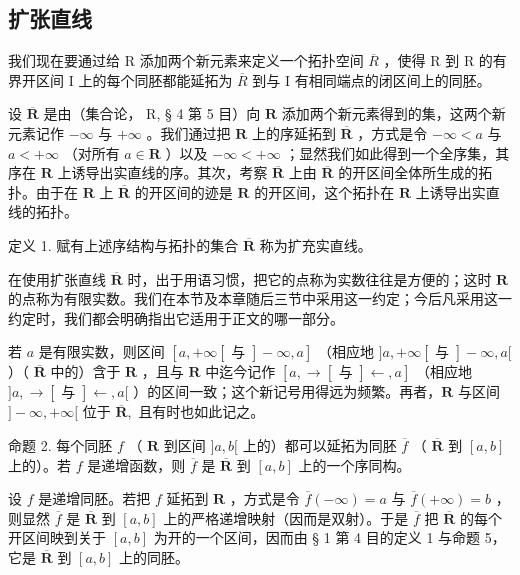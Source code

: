\subsection{扩张直线}

我们现在要通过给 R 添加两个新元素来定义一个拓扑空间 \(\overline{R}\) ，使得 R 到 R 的有界开区间 I 上的每个同胚都能延拓为 \(\overline{R}\) 到与 I 有相同端点的闭区间上的同胚。

设 \(\overline{\mathbf{R}}\) 是由（集合论， R, § 4 第 5 目）向 \(\mathbf{R}\) 添加两个新元素得到的集，这两个新元素记作 \(-\infty\) 与 \(+\infty\) 。我们通过把 \(\mathbf{R}\) 上的序延拓到 \(\overline{\mathbf{R}}\) ，方式是令 \(-\infty < a\) 与 \(a < +\infty\) （对所有 \(a \in \mathbf{R}\) ）以及 \(-\infty < +\infty\) ；显然我们如此得到一个全序集，其序在 \(\mathbf{R}\) 上诱导出实直线的序。其次，考察 \(\overline{\mathbf{R}}\) 上由 \(\overline{\mathbf{R}}\) 的开区间全体所生成的拓扑。由于在 \(\mathbf{R}\) 上 \(\overline{\mathbf{R}}\) 的开区间的迹是 \(\mathbf{R}\) 的开区间，这个拓扑在 \(\mathbf{R}\) 上诱导出实直线的拓扑。

定义 1. 赋有上述序结构与拓扑的集合 \(\overline{\mathbf{R}}\) 称为扩充实直线。

在使用扩张直线 \(\overline{\mathbf{R}}\) 时，出于用语习惯，把它的点称为实数往往是方便的；这时 \(\mathbf{R}\) 的点称为有限实数。我们在本节及本章随后三节中采用这一约定；今后凡采用这一约定时，我们都会明确指出它适用于正文的哪一部分。

若 \(a\) 是有限实数，则区间 \([a, +\infty[ \text{ 与 } ] - \infty, a]\) （相应地 \(]a, +\infty[ \text{ 与 } ] - \infty, a[\) ）（ \(\overline{\mathbf{R}}\) 中的）含于 \(\mathbf{R}\) ，且与 \(\mathbf{R}\) 中迄今记作 \([a, \rightarrow[ \text{ 与 } ] \leftarrow, a]\) （相应地 \(]a, \rightarrow[ \text{ 与 } ] \leftarrow, a[\) ）的区间一致；这个新记号用得远为频繁。再者，\(\mathbf{R}\) 与区间 \(] - \infty, +\infty[ \text{ 位于 } \overline{\mathbf{R}}, \text{ 且有时也如此记之。}\)

命题 2. 每个同胚 \(f\) （ \(\mathbf{R}\) 到区间 \(]a, b[\) 上的）都可以延拓为同胚 \(\overline{f}\) （ \(\overline{\mathbf{R}}\) 到 \([a, b]\) 上的）。若 \(f\) 是递增函数，则 \(\overline{f}\) 是 \(\overline{\mathbf{R}}\) 到 \([a, b]\) 上的一个序同构。

设 \(f\) 是递增同胚。若把 \(f\) 延拓到 \(\mathbf{R}\) ，方式是令 \(\overline{f}(-\infty) = a\) 与 \(\overline{f}(+\infty) = b\) ，则显然 \(\overline{f}\) 是 \(\overline{\mathbf{R}}\) 到 \([a, b]\) 上的严格递增映射（因而是双射）。于是 \(\overline{f}\) 把 \(\overline{\mathbf{R}}\) 的每个开区间映到关于 \([a, b]\) 为开的一个区间，因而由 § 1 第 4 目的定义 1 与命题 5，它是 \(\overline{\mathbf{R}}\) 到 \([a, b]\) 上的同胚。

